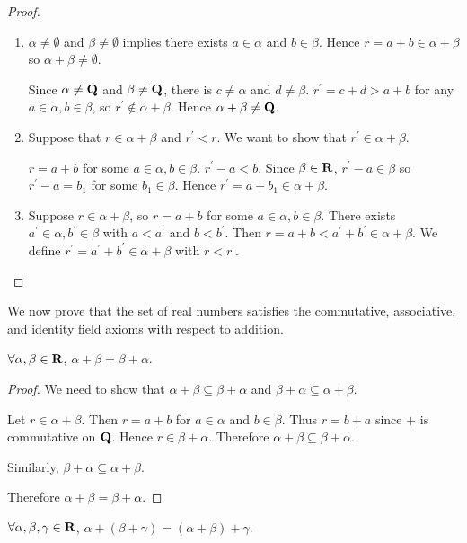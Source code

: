 \begin{proof} \
\begin{enumerate}[label=(\arabic*)]
\item $\alpha\neq\emptyset$ and $\beta\neq\emptyset$ implies there exists $a\in\alpha$ and $b\in\beta$. Hence $r=a+b\in\alpha+\beta$ so $\alpha+\beta\neq\emptyset$.

Since $\alpha\neq\mathbf Q$ and $\beta\neq\mathbf Q$, there is $c\neq\alpha$ and $d\neq\beta$. $r^\prime=c+d>a+b$ for any $a\in\alpha,b\in\beta$, so $r^\prime\notin\alpha+\beta$. Hence $\alpha+\beta\neq\mathbf Q$.

\item Suppose that $r\in\alpha+\beta$ and $r^\prime<r$. We want to show that $r^\prime\in\alpha+\beta$.

$r=a+b$ for some $a\in\alpha,b\in\beta$. $r^\prime-a<b$. Since $\beta\in\mathbf R$, $r^\prime-a\in\beta$ so $r^\prime-a=b_1$ for some $b_1\in\beta$. Hence $r^\prime=a+b_1\in\alpha+\beta$.

\item Suppose $r\in\alpha+\beta$, so $r=a+b$ for some $a\in\alpha,b\in\beta$. There exists $a^\prime\in\alpha,b^\prime\in\beta$ with $a<a^\prime$ and $b<b^\prime$. Then $r=a+b<a^\prime+b^\prime\in\alpha+\beta$. We define $r^\prime=a^\prime+b^\prime\in\alpha+\beta$ with $r<r^\prime$.
\end{enumerate}
\end{proof}

We now prove that the set of real numbers satisfies the commutative, associative, and identity field axioms with respect to addition.

\begin{proposition}
$\forall\alpha,\beta\in\mathbf R$, $\alpha+\beta=\beta+\alpha$.
\end{proposition}

\begin{proof}
We need to show that $\alpha+\beta\subseteq\beta+\alpha$ and $\beta+\alpha\subseteq\alpha+\beta$.

Let $r\in\alpha+\beta$. Then $r=a+b$ for $a\in\alpha$ and $b\in\beta$. Thus $r=b+a$ since $+$ is commutative on $\mathbf Q$. Hence $r\in\beta+\alpha$. Therefore $\alpha+\beta\subseteq\beta+\alpha$.

Similarly, $\beta+\alpha\subseteq\alpha+\beta$.

Therefore $\alpha+\beta=\beta+\alpha$.
\end{proof}

\begin{proposition}
$\forall\alpha,\beta,\gamma\in\mathbf R$, $\alpha+(\beta+\gamma)=(\alpha+\beta)+\gamma$.
\end{proposition}

